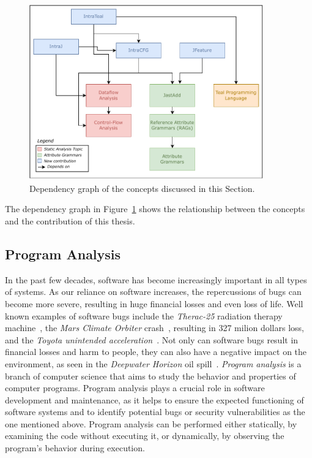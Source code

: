 \usetikzlibrary{backgrounds}
\begin{figure}[h]
    \centering
    \includegraphics[width=0.9\textwidth]{kappa/img/Dependencies.pdf}
  \caption{\label{fig:dependencygraph}Dependency graph of the concepts discussed in this Section.}
\end{figure}
The dependency graph in Figure~\ref{fig:dependencygraph} shows the relationship between
the concepts and the contribution of this thesis.

\subsection{Program Analysis}
In the past few decades, software has become increasingly important in all types of systems.
As our reliance on software increases, the repercussions of bugs can become more severe,
resulting in huge financial losses and even loss of life.
Well known examples of software bugs include the \emph{Therac-25} radiation therapy machine~\cite{leveson1993investigation},
the \emph{Mars Climate Orbiter} crash~\cite{Sawyer1999}, resulting in 327 milion dollars loss, and the \emph{Toyota unintended acceleration}~\cite{kane2010toyota}.
Not only can software bugs result in financial losses and harm to people, 
they can also have a negative impact on the environment, as seen in the \emph{Deepwater Horizon} oil spill~\cite{Shafer2010Oil}.
\emph{Program analysis} is a branch of computer science that aims to study the behavior 
and properties of computer programs. Program analysis plays a crucial role in software
development and maintenance, as it helps to ensure the expected functioning of software 
systems and to identify potential bugs or security vulnerabilities as the one mentioned above.
Program analysis can be performed either statically, by examining the code without executing it,
or dynamically, by observing the program's behavior during execution.


